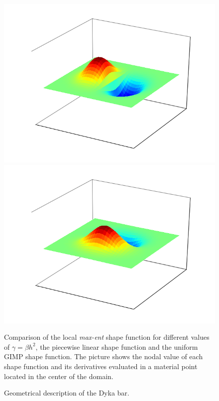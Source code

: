 \documentclass{article}
\begin{document}
\begin{figure}
{    \includegraphics[width=0.23\columnwidth]{Figures/LME_7_0_Shape_Fun_dx}
    \includegraphics[width=0.23\columnwidth]{Figures/LME_7_0_Shape_Fun_dy}
    \label{fig:LME_7.0_Shape_Fun}
  }
  \qquad
  \caption{Comparison of the local \textit{max-ent} shape function for
    different values of $\gamma = \beta h^2$, the piecewise linear shape function
    and the uniform GIMP shape function. The picture shows the nodal value
    of each shape function and its derivatives evaluated in a material
    point located in the center of the domain.}
  \label{fig:LME_MPM}
\end{figure}


\begin{figure}\sidecaption
  \centering
  \resizebox{\hsize}{!}{
    }
  \caption{Geometrical description of the Dyka \cite{Dyka1995} bar.}
  \label{fig:Dyka_Bar}
\end{figure}
\end{document}
